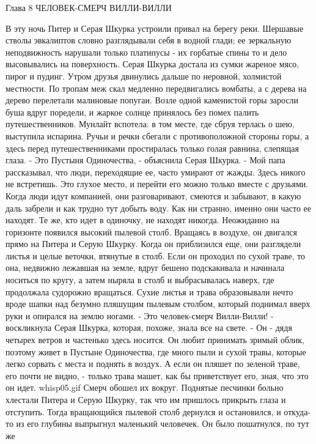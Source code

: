         Глава 8
        ЧЕЛОВЕК-СМЕРЧ ВИЛЛИ-ВИЛЛИ

    В эту ночь Питер и Серая Шкурка устроили привал на берегу реки. 
Шершавые стволы эвкалиптов словно разглядывали себя в водной глади; ее 
зеркальную неподвижность нарушали только платипусы - их горбатые спины 
то и дело высовывались на поверхность. Серая Шкурка достала из сумки 
жареное мясо, пирог и пудинг.
    Утром друзья двинулись дальше по неровной, холмистой местности. По 
тропам меж скал медленно передвигались вомбаты, а с дерева на дерево 
перелетали малиновые попугаи. Возле одной каменистой горы заросли буша 
вдруг поредели, и жаркое солнце принялось без помех палить 
путешественников. Мунлайт вспотела: в том месте, где сбруя терлась о 
шею, выступила испарина. Ручьи и речки сбегали с противоположной 
стороны горы, а здесь перед путешественниками простиралась только 
голая равнина, слепящая глаза.
    - Это Пустыня Одиночества, - объяснила Серая Шкурка. - Мой папа 
рассказывал, что люди, переходящие ее, часто умирают от жажды. Здесь 
никого не встретишь. Это глухое место, и перейти его можно только 
вместе с друзьями. Когда люди идут компанией, они разговаривают, 
смеются и забывают, в какую даль забрели и как трудно тут добыть воду. 
Как ни странно, именно они часто ее находят. Те же, кто идет в 
одиночку, не находят никогда.
    Неожиданно на горизонте появился высокий пылевой столб. Вращаясь в 
воздухе, он двигался прямо на Питера и Серую Шкурку. Когда он 
приблизился еще, они разглядели листья и целые веточки, втянутые в 
столб. Если он проходил по сухой траве, то она, недвижно лежавшая на 
земле, вдруг бешено подскакивала и начинала носиться по кругу, а затем 
ныряла в столб и выбрасывалась наверх, где продолжала судорожно 
вращаться. Сухие листья и трава образовывали нечто вроде шапки над 
безумно пляшущим пылевым столбом, который поднимал вверх руки и 
опирался на землю ногами.
    - Это человек-смерч Вилли-Вилли! - воскликнула Серая Шкурка, 
которая, похоже, знала все на свете. - Он - дядя четырех ветров и 
частенько здесь носится. Он любит принимать зримый облик, поэтому 
живет в Пустыне Одиночества, где много пыли и сухой травы, которые 
легко сорвать с места и поднять в воздух. А если он пляшет по зеленой 
траве, его почти не видно, - только трава машет, как бы приветствует 
его, зная, что это он идет.
    {whisp05.gif}
    Смерч обошел их вокруг. Поднятые песчинки больно хлестали Питера и 
Серую Шкурку, так что им пришлось прикрыть глаза и отступить. Тогда 
вращающийся пылевой столб дернулся и остановился, и откуда-то из его 
глубины выпрыгнул маленький человечек. Он было пошатнулся, по тут же 
